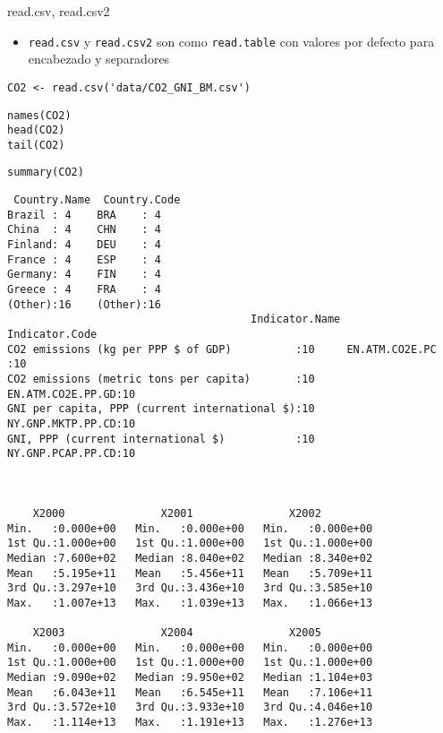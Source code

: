 \documentclass[xcolor={usenames,svgnames,dvipsnames}]{beamer}
\begin{document}
\begin{frame}[fragile,label=sec-2-3]{read.csv, read.csv2}
 \begin{itemize}
\item \texttt{read.csv} y \texttt{read.csv2} son como \texttt{read.table} con valores
por defecto para encabezado y separadores
\end{itemize}

\lstset{language=R,numbers=none}
\begin{lstlisting}
CO2 <- read.csv('data/CO2_GNI_BM.csv')
\end{lstlisting}

\lstset{language=R,numbers=none}
\begin{lstlisting}
names(CO2)
head(CO2)
tail(CO2)
\end{lstlisting}
\lstset{language=R,numbers=none}
\begin{lstlisting}
summary(CO2)
\end{lstlisting}

\begin{verbatim}
 Country.Name  Country.Code
Brazil : 4    BRA    : 4   
China  : 4    CHN    : 4   
Finland: 4    DEU    : 4   
France : 4    ESP    : 4   
Germany: 4    FIN    : 4   
Greece : 4    FRA    : 4   
(Other):16    (Other):16   
                                      Indicator.Name           Indicator.Code
CO2 emissions (kg per PPP $ of GDP)          :10     EN.ATM.CO2E.PC   :10    
CO2 emissions (metric tons per capita)       :10     EN.ATM.CO2E.PP.GD:10    
GNI per capita, PPP (current international $):10     NY.GNP.MKTP.PP.CD:10    
GNI, PPP (current international $)           :10     NY.GNP.PCAP.PP.CD:10    



    X2000               X2001               X2002          
Min.   :0.000e+00   Min.   :0.000e+00   Min.   :0.000e+00  
1st Qu.:1.000e+00   1st Qu.:1.000e+00   1st Qu.:1.000e+00  
Median :7.600e+02   Median :8.040e+02   Median :8.340e+02  
Mean   :5.195e+11   Mean   :5.456e+11   Mean   :5.709e+11  
3rd Qu.:3.297e+10   3rd Qu.:3.436e+10   3rd Qu.:3.585e+10  
Max.   :1.007e+13   Max.   :1.039e+13   Max.   :1.066e+13  

    X2003               X2004               X2005          
Min.   :0.000e+00   Min.   :0.000e+00   Min.   :0.000e+00  
1st Qu.:1.000e+00   1st Qu.:1.000e+00   1st Qu.:1.000e+00  
Median :9.090e+02   Median :9.950e+02   Median :1.104e+03  
Mean   :6.043e+11   Mean   :6.545e+11   Mean   :7.106e+11  
3rd Qu.:3.572e+10   3rd Qu.:3.933e+10   3rd Qu.:4.046e+10  
Max.   :1.114e+13   Max.   :1.191e+13   Max.   :1.276e+13  


\end{verbatim}
\end{frame}
\end{document}

